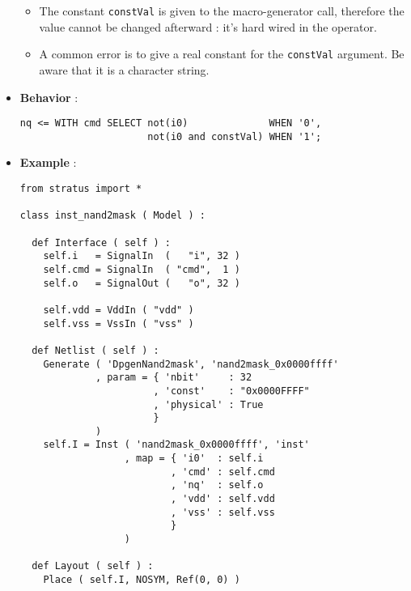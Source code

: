 \begin{itemize}
\begin{itemize}
        \item The constant \verb-constVal- is given to the macro-generator call, therefore the value cannot be changed afterward : it's hard wired in the operator.
        \item A common error is to give a real constant for the \verb-constVal- argument. Be aware that it is a character string.
    \end{itemize}    
    \item \textbf{Behavior} :
\begin{verbatim}
nq <= WITH cmd SELECT not(i0)              WHEN '0',
                      not(i0 and constVal) WHEN '1';
\end{verbatim}
    \item \textbf{Example} :
\begin{verbatim}
from stratus import *

class inst_nand2mask ( Model ) :

  def Interface ( self ) :
    self.i   = SignalIn  (   "i", 32 )
    self.cmd = SignalIn  ( "cmd",  1 )
    self.o   = SignalOut (   "o", 32 )

    self.vdd = VddIn ( "vdd" )
    self.vss = VssIn ( "vss" )
    
  def Netlist ( self ) :
    Generate ( 'DpgenNand2mask', 'nand2mask_0x0000ffff'
             , param = { 'nbit'     : 32
                       , 'const'    : "0x0000FFFF"
                       , 'physical' : True
                       }
             )      
    self.I = Inst ( 'nand2mask_0x0000ffff', 'inst'
                  , map = { 'i0'  : self.i
                          , 'cmd' : self.cmd
                          , 'nq'  : self.o
                          , 'vdd' : self.vdd
                          , 'vss' : self.vss
                          }
                  )
    
  def Layout ( self ) :
    Place ( self.I, NOSYM, Ref(0, 0) )
\end{verbatim}
\end{itemize}
